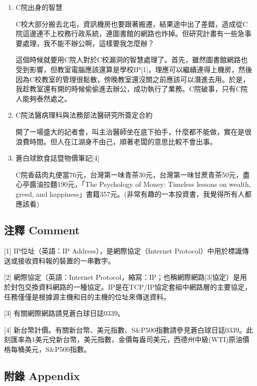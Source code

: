 \documentclass[
]{article}
\begin{document}
\begin{enumerate}
\def\labelenumi{\arabic{enumi}.}
\item
  C院出身的智慧

  C校大部分搬去北屯，資訊機房也要跟著搬遷，結果途中出了差錯，造成從C院這邊連不上校務行政系統，連圖書館的網路也炸掉。但研究計畫有一些急事要處理，我不能不辦公啊，這樣要我怎麼辦？

  這個時候就要用C院人對於C校漏洞的智慧處理了。首先，雖然圖書館網路也受到影響，但教室電腦應該還算是學校IP{[}1{]}，理應可以繼續連得上機房，然後因為C校教室的管理很鬆散，傍晚教室還沒關之前應該可以潛進去用。於是，我趁教室還有開的時候偷偷進去辦公，成功執行了業務。C院破事，只有C院人能夠泰然處之。
\item
  C院法醫病理科與法務部法醫研究所簽定合約

  開了一場盛大的記者會，叫主治醫師坐在底下拍手，什麼都不能做，實在是很浪費時間。但人在江湖身不由己，順著老闆的意思比較不會出事。
\item
  蒼白球飲食誌暨物價筆記{[}4{]}

  C院香菇肉丸便當76元，台灣第一味青茶30元，台灣第一味甘蔗青茶50元，盡心亭醬油拉麵190元，「The
  Psychology of Money: Timeless lessons on wealth, greed, and
  happiness」書籍357元。(非常有趣的一本投資書，我覺得所有人都應該看)
\end{enumerate}

\hypertarget{ux6ce8ux91cb-comment-15}{%
\subsection{注釋 Comment}\label{ux6ce8ux91cb-comment-15}}

{[}1{]} IP位址（英語：IP Address），是網際協定（Internet
Protocol）中用於標識傳送或接收資料報的裝置的一串數字。

{[}2{]} 網際協定（英語：Internet
Protocol，縮寫：IP；也稱網際網路{[}3{]}協定）是用於封包交換資料網路的一種協定。IP是在TCP/IP協定套組中網路層的主要協定，任務僅僅是根據源主機和目的主機的位址來傳送資料。

{[}3{]} 有關網際網路請見蒼白球日誌0339。

{[}4{]}
新台幣計價。有關新台幣、美元指數、S\&P500指數請參見蒼白球日誌0339。此刻匯率為1美元兌新台幣，美元指數，金價每盎司美元，西德州中級(WTI)原油價格每桶美元，S\&P500指數。

\hypertarget{ux9644ux9304-appendix-15}{%
\subsection{附錄 Appendix}\label{ux9644ux9304-appendix-15}}
\end{document}
